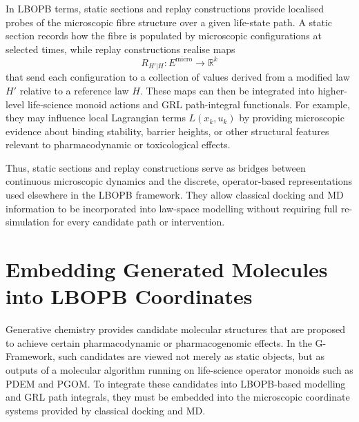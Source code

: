 \documentclass[11pt]{book}
\theoremstyle{plain}
\theoremstyle{definition}
\theoremstyle{remark}
\begin{document}
In LBOPB terms, static sections and replay constructions provide
localised probes of the microscopic fibre structure over a given
life-state path. A static section records how the fibre is populated
by microscopic configurations at selected times, while replay
constructions realise maps
\[
  R_{H'|H} \colon E^{\mathrm{micro}} \to \mathbb{R}^{k}
\]
that send each configuration to a collection of values derived from a
modified law $H'$ relative to a reference law $H$. These maps can then
be integrated into higher-level life-science monoid actions and GRL
path-integral functionals. For example, they may influence local
Lagrangian terms $L(x_{k},u_{k})$ by providing microscopic evidence
about binding stability, barrier heights, or other structural features
relevant to pharmacodynamic or toxicological effects.

Thus, static sections and replay constructions serve as bridges
between continuous microscopic dynamics and the discrete, operator-based
representations used elsewhere in the LBOPB framework. They allow
classical docking and MD information to be incorporated into law-space
modelling without requiring full re-simulation for every candidate
path or intervention.

\section{Embedding Generated Molecules into LBOPB Coordinates}


Generative chemistry provides candidate molecular structures that are
proposed to achieve certain pharmacodynamic or pharmacogenomic
effects. In the G-Framework, such candidates are viewed not merely as
static objects, but as outputs of a molecular algorithm running on
life-science operator monoids such as PDEM and PGOM. To integrate these
candidates into LBOPB-based modelling and GRL path integrals, they must
be embedded into the microscopic coordinate systems provided by
classical docking and MD.
\end{document}
